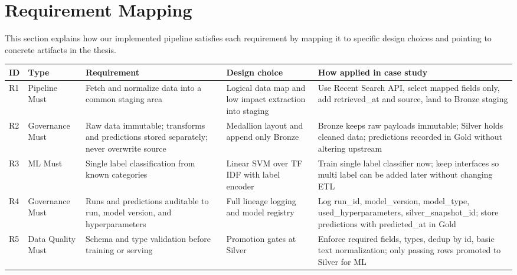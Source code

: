 \section{Requirement Mapping}
This section explains how our implemented pipeline satisfies each requirement by mapping it to specific design choices and pointing to concrete artifacts in the thesis.

\begin{table}[tbp]
    \centering
    \footnotesize
    \begin{tabularx}{\linewidth}{@{}l l Y Y Y@{}}
        \toprule
        \textbf{ID} & \textbf{Type}     & \textbf{Requirement}                                                                     & \textbf{Design choice}                                  & \textbf{How applied in case study}                                                                                                  \\
        \midrule
        R1          & Pipeline Must     & Fetch and normalize data into a common staging area                                      & Logical data map and low impact extraction into staging & Use Recent Search API, select mapped fields only, add retrieved\_at and source, land to Bronze staging                              \\
        R2          & Governance Must   & Raw data immutable; transforms and predictions stored separately; never overwrite source & Medallion layout and append only Bronze                 & Bronze keeps raw payloads immutable; Silver holds cleaned data; predictions recorded in Gold without altering upstream              \\
        R3          & ML Must           & Single label classification from known categories                                        & Linear SVM over TF IDF with label encoder               & Train single label classifier now; keep interfaces so multi label can be added later without changing ETL                           \\
        R4          & Governance Must   & Runs and predictions auditable to run, model version, and hyperparameters                & Full lineage logging and model registry                 & Log run\_id, model\_version, model\_type, used\_hyperparameters, silver\_snapshot\_id; store predictions with predicted\_at in Gold \\
        R5          & Data Quality Must & Schema and type validation before training or serving                                    & Promotion gates at Silver                               & Enforce required fields, types, dedup by id, basic text normalization; only passing rows promoted to Silver for ML                  \\

\end{tabularx}
\end{table}
